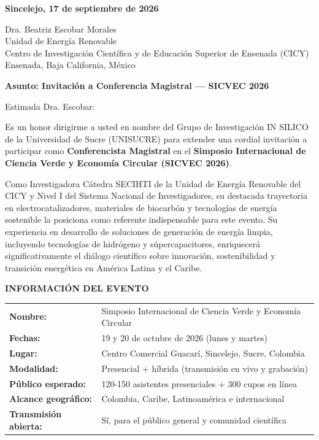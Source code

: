 \documentclass[12pt,a4paper]{article}
\begin{document}
\vspace{0.5cm}

\noindent
\textbf{Sincelejo, 17 de septiembre de 2026}

\vspace{0.8cm}

\noindent
Dra. Beatriz Escobar Morales\\
Unidad de Energía Renovable\\
Centro de Investigación Científica y de Educación Superior de Ensenada (CICY)\\
Ensenada, Baja California, México

\vspace{0.8cm}

\noindent
\textbf{\large Asunto: Invitación a Conferencia Magistral — SICVEC 2026}

\vspace{0.8cm}

Estimada Dra. Escobar:

\vspace{0.8cm}

Es un honor dirigirme a usted en nombre del Grupo de Investigación IN SILICO de la Universidad de Sucre (UNISUCRE) para extender una cordial invitación a participar como \textbf{Conferencista Magistral} en el \textbf{Simposio Internacional de Ciencia Verde y Economía Circular (SICVEC 2026)}.

Como Investigadora Cátedra SECIHTI de la Unidad de Energía Renovable del CICY y Nivel I del Sistema Nacional de Investigadores, su destacada trayectoria en electrocatalizadores, materiales de biocarbón y tecnologías de energía sostenible la posiciona como referente indispensable para este evento. Su experiencia en desarrollo de soluciones de generación de energía limpia, incluyendo tecnologías de hidrógeno y súpercapacitores, enriquecerá significativamente el diálogo científico sobre innovación, sostenibilidad y transición energética en América Latina y el Caribe.

\vspace{0.5cm}

\noindent
\textbf{INFORMACIÓN DEL EVENTO}

\begin{tabular}{ll}
\textbf{Nombre:} & Simposio Internacional de Ciencia Verde y Economía Circular \\
\textbf{Fechas:} & 19 y 20 de octubre de 2026 (lunes y martes) \\
\textbf{Lugar:} & Centro Comercial Guacarí, Sincelejo, Sucre, Colombia \\
\textbf{Modalidad:} & Presencial + híbrida (transmisión en vivo y grabación) \\
\textbf{Público esperado:} & 120-150 asistentes presenciales + 300 cupos en línea \\
\textbf{Alcance geográfico:} & Colombia, Caribe, Latinoamérica e internacional \\
\textbf{Transmisión abierta:} & Sí, para el público general y comunidad científica \\
\end{tabular}
\end{document}
